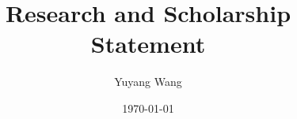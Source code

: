 



\title{Research and Scholarship Statement}

\author{Yuyang Wang}
\date{\today}
\makeatletter
\fancyfoot[L]{\scshape \MakeLowercase{\@author}}
\fancyfoot[R]{{\scshape \MakeLowercase{\@title}}\quad{\LARGE\sfrac{\thepage}{\pageref*{LastPage}}}}
\makeatother



\maketitle%
\thispagestyle{fancy}


\collabCustom{}


\footnotesize


